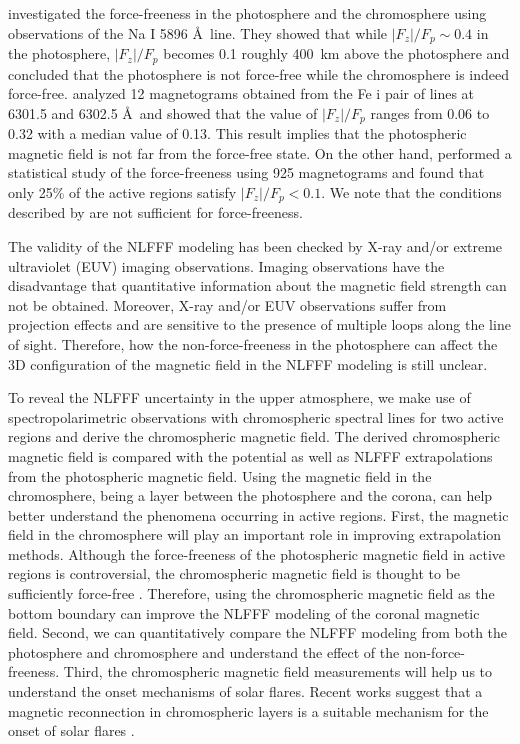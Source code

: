 \documentclass[manuscript]{aastex61}
\begin{document}
\cite{1995ApJ...439..474M} investigated the force-freeness in the photosphere
and the chromosphere using observations of the Na \textsc{I} 5896 \AA\ line. They showed that while
$|F_{z}|/F_p\sim0.4$ in the photosphere,  $|F_{z}|/F_p$ becomes 0.1 roughly
400~km above the photosphere and concluded that the photosphere is not force-free
while the chromosphere is indeed force-free. \cite{2002ApJ...568..422M} analyzed 12 magnetograms
obtained from the Fe {\sc i} pair of lines at 6301.5 and 6302.5 \AA\ and showed that the value of
$|F_{z}|/F_p$ ranges from 0.06 to 0.32 with a median value of 0.13. This result
implies that the photospheric magnetic field is not far from the force-free
state. On the other hand, \cite{2013PASA...30....5L} performed a statistical study
of the force-freeness using 925 magnetograms and found that only 25\% of the active
regions satisfy $|F_{z}|/F_p < 0.1$. 
We note that the conditions described by \cite{1985svmf.nasa...49L}
are not sufficient for force-freeness.

The validity of the NLFFF modeling has been checked by X-ray and/or extreme ultraviolet (EUV)
imaging observations. Imaging observations have the disadvantage that
quantitative information about the magnetic field strength can not be obtained.
Moreover, X-ray and/or EUV observations suffer from projection effects and
are sensitive to the presence of multiple loops along the line of sight. Therefore, how the non-force-freeness in the
photosphere can affect the 3D configuration of the magnetic field in the NLFFF
modeling is still unclear.

To reveal the NLFFF uncertainty in the upper atmosphere, we make use of spectropolarimetric observations with chromospheric spectral lines for two active regions and derive the chromospheric magnetic field. 
The derived chromospheric magnetic field is compared with the potential as well as NLFFF extrapolations from the photospheric magnetic field. 
Using the magnetic field in the chromosphere, being a layer between the photosphere and the corona, can help
better understand the phenomena occurring in active regions. 
First, the magnetic field in the chromosphere will play an important role in improving extrapolation methods. Although the force-freeness of the photospheric magnetic field in active regions is
controversial, the chromospheric magnetic field is thought to be
sufficiently force-free \citep{1995ApJ...439..474M, 2001SoPh..203...71G}.
Therefore, using the chromospheric magnetic field as the bottom boundary can improve
the NLFFF modeling of the coronal magnetic field. Second, we can quantitatively
compare the NLFFF modeling from both the photosphere and chromosphere and understand the
effect of the non-force-freeness. 
Third, the chromospheric magnetic field measurements will help us to understand the onset mechanisms of solar flares.
Recent works suggest that a magnetic reconnection in chromospheric layers is a suitable mechanism for the onset of solar flares \citep{2012ApJ...760...31K, 2013ApJ...778...48B, 2017NatAs...1E..85W}. 
\end{document}
